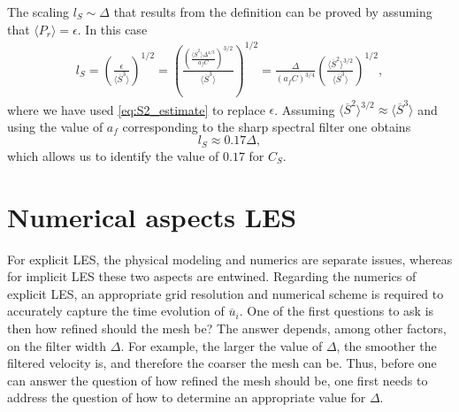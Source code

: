 \documentclass[oneside,a4paper,11pt]{report}
\newcommand{\ures}{\overline{u}}
\begin{document}
The scaling $l_S \sim \Delta$ that results from the definition can be proved by assuming that $\langle P_r \rangle = \epsilon$. In this case
\begin{align}
l_S = \left ( \frac{\epsilon}{ \langle \overline{S}^3 \rangle} \right ) ^{1/2} = \left ( \frac{ \left (\frac{\langle \overline{S}^2 \rangle \Delta^{4/3} }{a_f C} \right )^{3/2}}{ \langle \overline{S}^3 \rangle} \right ) ^{1/2} = \frac{\Delta}{ (a_f C)^{3/4}} \left ( \frac{ \langle \overline{S}^2 \rangle^{3/2}}{\langle \overline{S}^3 \rangle} \right )^{1/2},
\end{align}
where we have used \cref{eq:S2_estimate} to replace $\epsilon$. Assuming $\langle \overline{S}^2 \rangle^{3/2} \approx \langle \overline{S}^3 \rangle$ and using the value of $a_f$ corresponding to the sharp spectral filter one obtains
\begin{equation}
l_S \approx 0.17 \Delta,
\end{equation}
which allows us to identify the value of $0.17$ for $C_S$.

\section{Numerical aspects LES}
For explicit LES, the physical modeling and numerics are separate issues, whereas for implicit LES these two aspects are entwined. Regarding the numerics of explicit LES, an appropriate grid resolution and numerical scheme is required to accurately capture the time evolution of $\ures_i$. One of the first questions to ask is then how refined should the mesh be? The answer depends, among other factors, on the filter width $\Delta$. For example, the larger the value of $\Delta$, the smoother the filtered velocity is, and therefore the coarser the mesh can be. Thus, before one can answer the question of how refined the mesh should be, one first needs to address the question of how to determine an appropriate value for $\Delta$.
\end{document}
